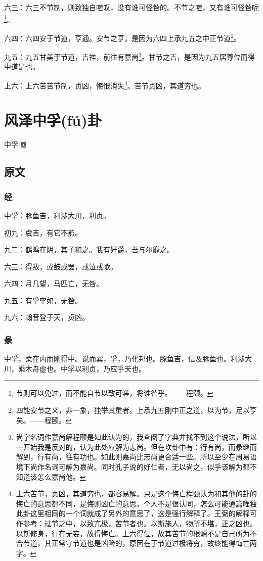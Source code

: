 \documentclass[12pt,oneside]{book}
\begin{document}
六三：六三不节制，则致独自嗟叹，没有谁可怪咎的。不节之嗟，又有谁可怪咎呢\footnote{节则可以免过，而不能自节以致可嗟，将谁咎乎。——程颐。}。


六四：六四安于节道，亨通。安节之亨，是因为六四上承九五之中正节道\footnote{四能安节之义，非一象，独举其重者。上承九五刚中正之道，以为节，足以亨矣。——程颐。}。

九五：九五甘美于节道，吉祥，前往有嘉尚\footnote{尚字名词作嘉尚解程颐是如此认为的，我查阅了字典并找不到这个说法，所以一开始我是反对的，认为此处应解为志尚。但在坎卦中有：行有尚，而彖继而解到，行有尚，往有功也。如此则嘉尚比志尚更合适一些。所以至少在周易语境下尚作名词可解为嘉尚。同时孔子说的好仁者，无以尚之，似乎该解为都不知道该怎么嘉尚他。}。甘节之吉，是因为九五居尊位而得中道是也。

上六：上六苦苦节制，贞凶，悔恨消失\footnote{上六苦节，贞凶，其道穷也，都容易解。只是这个悔亡程颐认为和其他的卦的悔亡的意思都不同，是悔则凶亡的意思。个人不是很认同，怎么可能通篇唯独此卦这里相同的一个词就成了另外的意思了，这是强行解释了。王弼的解释可作参考：过节之中，以致亢极，苦节者也。以斯施人，物所不堪，正之凶也。以斯修身，行在无妄，故得悔亡。上六得位，故其苦节的根源不是自己所为不合节道，其正常守节道也是凶险的，原因在于节道过极将穷，故终能得悔亡两字。}。苦节贞凶，其道穷也。


\chapter{风泽中孚(fú)卦}
中孚 {\LARGE ䷼}


\section{原文}

\subsection{经}
中孚：豚鱼吉，利涉大川，利贞。

初九：虞吉，有它不燕。

九二：鹤鸣在阴，其子和之。我有好爵，吾与尔靡之。

六三：得敌，或鼓或罢，或泣或歌。

六四：月几望，马匹亡，无咎。

九五：有孚挛如，无咎。

九六：翰音登于天，贞凶。

\subsection{彖}
中孚，柔在内而刚得中。说而巽，孚，乃化邦也。豚鱼吉，信及豚鱼也。利涉大川，乘木舟虚也。中孚以利贞，乃应乎天也。
\end{document}
